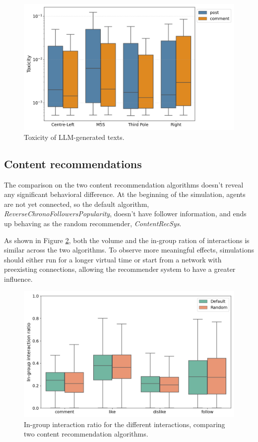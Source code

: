 \begin{figure}[h]
    \centering
    \includegraphics[width=1\linewidth]{Images/Toxicity/box_posts_vs_comments.png}
    \caption{Toxicity of LLM-generated texts.}
    \label{fig:toxicity_box}
\end{figure}


\subsection{Content recommendations}
The comparison on the two content recommendation algorithms doesn't reveal any significant behavioral difference.
At the beginning of the simulation, agents are not yet connected, so the default algorithm, \textit{ReverseChronoFollowersPopularity}, doesn't have follower information, and ends up behaving as the random recommender, \textit{ContentRecSys}.

As shown in Figure \ref{fig:recsys_comparison}, both the volume and the in-group ration of interactions is similar across the two algorithms.
To observe more meaningful effects, simulations should either run for a longer virtual time or start from a network with preexisting connections, allowing the recommender system to have a greater influence.


\begin{figure}[h]
    \centering
    \includegraphics[width=1\linewidth]{Images/Recsys/recsys_in_group_ratio.png}
    \caption{In-group interaction ratio for the different interactions, comparing two content recommendation algorithms.}
    \label{fig:recsys_comparison}
\end{figure}